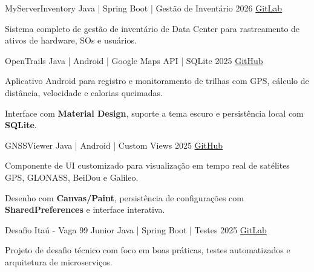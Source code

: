 \resumeProject
{MyServerInventory}
{Java | Spring Boot | Gestão de Inventário}
{2026}
{\href{https://gitlab.com/RafaelQSantos-RQS/MyServerInventory}{GitLab}}
\resumeItemListStart
\item {Sistema completo de gestão de inventário de Data Center para rastreamento de ativos de hardware, SOs e usuários.}
\resumeItemListEnd

\resumeProject
{OpenTrails}
{Java | Android | Google Maps API | SQLite}
{2025}
{\href{https://github.com/RafaelQSantos-RQS/OpenTrails}{GitHub}}
\resumeItemListStart
\item {Aplicativo Android para registro e monitoramento de trilhas com GPS, cálculo de distância, velocidade e calorias queimadas.}
\item {Interface com \textbf{Material Design}, suporte a tema escuro e persistência local com \textbf{SQLite}.}
\resumeItemListEnd

\resumeProject
{GNSSViewer}
{Java | Android | Custom Views}
{2025}
{\href{https://github.com/RafaelQSantos-RQS/GNSSViewer}{GitHub}}
\resumeItemListStart
\item {Componente de UI customizado para visualização em tempo real de satélites GPS, GLONASS, BeiDou e Galileo.}
\item {Desenho com \textbf{Canvas/Paint}, persistência de configurações com \textbf{SharedPreferences} e interface interativa.}
\resumeItemListEnd

\resumeProject
{Desafio Itaú - Vaga 99 Junior}
{Java | Spring Boot | Testes}
{2025}
{\href{https://gitlab.com/RafaelQSantos-RQS/desafio-itau-vaga-99-junior}{GitLab}}
\resumeItemListStart
\item {Projeto de desafio técnico com foco em boas práticas, testes automatizados e arquitetura de microserviços.}
\resumeItemListEnd

\resumeSubHeadingListEnd
\vspace{-5.5mm}


